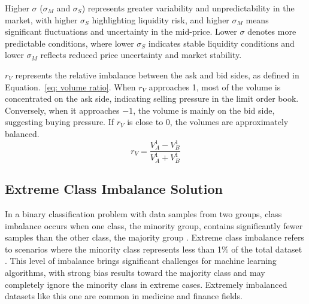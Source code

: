Higher $\sigma$ ($\sigma_M$ and $\sigma_S$) represents greater variability and unpredictability in the market, with higher $\sigma_{S}$ highlighting liquidity risk, and higher $\sigma_{M}$ means significant fluctuations and uncertainty in the mid-price. Lower $\sigma$ denotes more predictable conditions, where lower $\sigma_{S}$ indicates stable liquidity conditions and lower $\sigma_{M}$ reflects reduced price uncertainty and market stability.

$r_V$ represents the relative imbalance between the ask and bid sides, as defined in Equation.~\ref{eq: volume ratio}. When $r_V$ approaches 1, most of the volume is concentrated on the ask side, indicating selling pressure in the limit order book. Conversely, when it approaches $-1$, the volume is mainly on the bid side, suggesting buying pressure. If $r_V$ is close to 0, the volumes are approximately balanced.
\begin{equation}
    r_V = \frac{V_A ^ {1} - V_B ^ {1}}{V_A ^ {1} + V_B ^ {1}}
    \label{eq: volume ratio}
\end{equation}

\subsection{Extreme Class Imbalance Solution} \label{sec: class imbalance}
In a binary classification problem with data samples from two groups, class imbalance occurs when one class, the minority group, contains significantly fewer samples than the other class, the majority group \citep{johnson_survey_2019}. Extreme class imbalance refers to scenarios where the minority class represents less than 1\% of the total dataset \citep{leevy_survey_2018}. This level of imbalance brings significant challenges for machine learning algorithms, with strong bias results toward the majority class and may completely ignore the minority class in extreme cases. Extremely imbalanced datasets like this one are common in medicine and finance fields.

